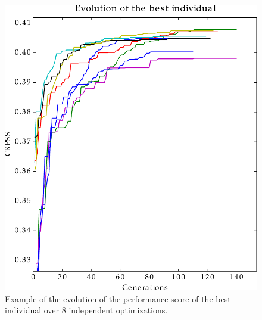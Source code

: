 \documentclass[5p]{elsarticle}
\begin{document}
\begin{figure}[htb]
	\centerline{\includegraphics[width=\linewidth]{figures/figure_evolution.pdf}}
	\caption{Example of the evolution of the performance score of the best individual over 8 independent optimizations.}
	\label{fig:evolution}
\end{figure}
\end{document}
